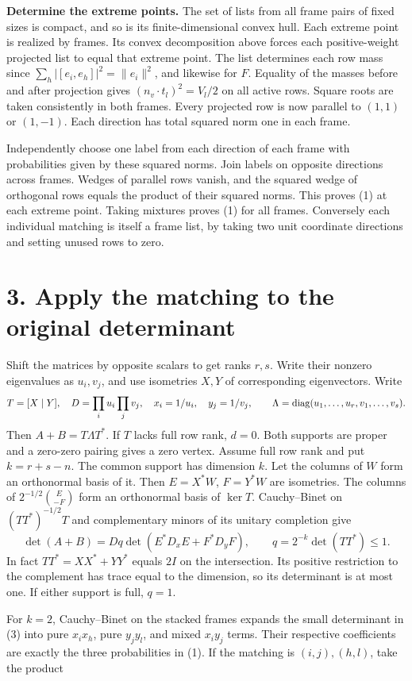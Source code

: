 \documentclass[11pt]{article}
\newcommand{\heading}[1]{\section*{\color{ink}#1}}
\begin{document}
\par\textbf{Determine the extreme points.} The set of lists from all frame pairs of fixed sizes is compact, and so is its finite-dimensional convex hull. Each extreme point is realized by frames. Its convex decomposition above forces each positive-weight projected list to equal that extreme point. The list determines each row mass since $\sum_h |[e_i,e_h]|^2=\|e_i\|^2$, and likewise for $F$. Equality of the masses before and after projection gives $(n_v\cdot t_l)^2=V_l/2$ on all active rows. Square roots are taken consistently in both frames. Every projected row is now parallel to $(1,1)$ or $(1,-1)$. Each direction has total squared norm one in each frame.
\par Independently choose one label from each direction of each frame with probabilities given by these squared norms. Join labels on opposite directions across frames. Wedges of parallel rows vanish, and the squared wedge of orthogonal rows equals the product of their squared norms. This proves (1) at each extreme point. Taking mixtures proves (1) for all frames. Conversely each individual matching is itself a frame list, by taking two unit coordinate directions and setting unused rows to zero.
\newpage
\heading{3. Apply the matching to the original determinant}
Shift the matrices by opposite scalars to get ranks $r,s$. Write their nonzero eigenvalues as $u_i,v_j$, and use isometries $X,Y$ of corresponding eigenvectors. Write
\[
 T=[X\mid Y],\quad D=\prod_i u_i\prod_j v_j,\quad x_i=1/u_i,\quad y_j=1/v_j,
 \qquad \Lambda=\operatorname{diag}(u_1,\ldots,u_r,v_1,\ldots,v_s).
\]
Then $A+B=T\Lambda T^*$. If $T$ lacks full row rank, $d=0$. Both supports are proper and a zero-zero pairing gives a zero vertex. Assume full row rank and put $k=r+s-n$. The common support has dimension $k$. Let the columns of $W$ form an orthonormal basis of it. Then $E=X^*W$, $F=Y^*W$ are isometries. The columns of $2^{-1/2}\binom E{-F}$ form an orthonormal basis of $\ker T$. Cauchy--Binet on $(TT^*)^{-1/2}T$ and complementary minors of its unitary completion give
\[
 \det(A+B)=Dq\det(E^*D_xE+F^*D_yF),\qquad q=2^{-k}\det(TT^*)\le1. \tag{3}
\]
In fact $TT^*=XX^*+YY^*$ equals $2I$ on the intersection. Its positive restriction to the complement has trace equal to the dimension, so its determinant is at most one. If either support is full, $q=1$.
\par For $k=2$, Cauchy--Binet on the stacked frames expands the small determinant in (3) into pure $x_ix_h$, pure $y_jy_l$, and mixed $x_iy_j$ terms. Their respective coefficients are exactly the three probabilities in (1). If the matching is $(i,j),(h,l)$, take the product
\end{document}
